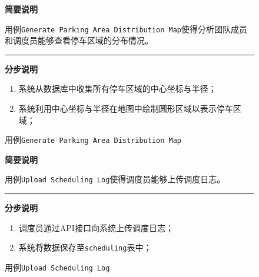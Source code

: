 \begin{figure}
    \centering
 \begin{mdframed}[leftmargin=0pt, rightmargin=0pt]
    \textbf{简要说明}

    用例\texttt{Generate Parking Area Distribution Map}使得分析团队成员和调度员能够查看停车区域的分布情况。

\noindent\rule{\textwidth}{0.5pt} %
    \textbf{分步说明}

    \begin{enumerate}
        \item 系统从数据库中收集所有停车区域的中心坐标与半径；
        \item 系统利用中心坐标与半径在地图中绘制圆形区域以表示停车区域；
    \end{enumerate}
\end{mdframed}   
\caption{用例\texttt{Generate Parking Area Distribution Map}}\label{GenerateParkingAreaDistributionMap}
\end{figure}

\begin{figure}
    \centering
 \begin{mdframed}[leftmargin=0pt, rightmargin=0pt]
    \textbf{简要说明}

    用例\texttt{Upload Scheduling Log}使得调度员能够上传调度日志。

\noindent\rule{\textwidth}{0.5pt} %
    \textbf{分步说明}

    \begin{enumerate}
        \item 调度员通过API接口向系统上传调度日志；
        \item 系统将数据保存至\texttt{scheduling}表中；
    \end{enumerate}
\end{mdframed}   
\caption{用例\texttt{Upload Scheduling Log}}\label{UploadSchedulingLog}
\end{figure}



